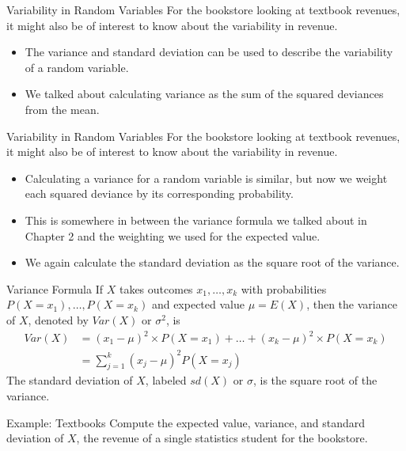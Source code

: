 \begin{frame}{Variability in Random Variables}
    For the bookstore looking at textbook revenues, it might also be of interest to know about the variability in revenue.
    \begin{itemize}
        \item The variance and standard deviation can be used to describe the variability of a random variable.
        \item We talked about calculating variance as the sum of the squared deviances from the mean. 
    \end{itemize}
\end{frame}

\begin{frame}{Variability in Random Variables}
    For the bookstore looking at textbook revenues, it might also be of interest to know about the variability in revenue.
    \begin{itemize}
        \item Calculating a variance for a random variable is similar, but now we weight each squared deviance by its corresponding probability.
        \item This is somewhere in between the variance formula we talked about in Chapter 2 and the weighting we used for the expected value.
        \item We again calculate the standard deviation as the square root of the variance. 
    \end{itemize}
\end{frame}

\begin{frame}{Variance Formula}
    If $X$ takes outcomes $x_1, \dots, x_k$ with probabilities $P(X = x_1), \dots, P(X = x_k)$ and expected value $\mu=E(X)$, then the variance of $X$, denoted by $Var(X)$ or $\sigma^2$, is
    \begin{align*}
        Var(X) &= (x_1−\mu)^2\times P(X=x_1)+\dots + (x_k − \mu)^2 \times P (X = x_k ) \\
        &= \sum_{j=1}^k (x_j - \mu)^2 P(X=x_j)
    \end{align*}
    The standard deviation of $X$, labeled $sd(X)$ or $\sigma$, is the square root of the variance.
\end{frame}

\begin{frame}{Example: Textbooks}
    Compute the expected value, variance, and standard deviation of $X$, the revenue of a single statistics student for the bookstore.
\end{frame}

